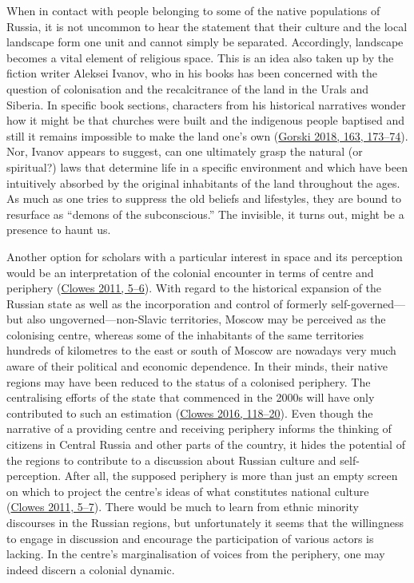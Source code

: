 \documentclass[
  english,
  a4paper,
  DIV=12,
  footlines=2.1,
  usegeometry=true]{scrartcl}
\begin{document}
\leavevmode\marginpar{\textcolor{parnum}{{[}8{]}}}When in contact with
people belonging to some of the native populations of Russia, it is not
uncommon to hear the statement that their culture and the local
landscape form one unit and cannot simply be separated. Accordingly,
landscape becomes a vital element of religious space. This is an idea
also taken up by the fiction writer Aleksei Ivanov, who in his books has
been concerned with the question of colonisation and the recalcitrance
of the land in the Urals and Siberia. In specific book sections,
characters from his historical narratives wonder how it might be that
churches were built and the indigenous people baptised and still it
remains impossible to make the land one's own
(\protect\hyperlink{ref-gorski_enchanted_2018}{Gorski 2018, 163,
173--74}). Nor, Ivanov appears to suggest, can one ultimately grasp the
natural (or spiritual?) laws that determine life in a specific
environment and which have been intuitively absorbed by the original
inhabitants of the land throughout the ages. As much as one tries to
suppress the old beliefs and lifestyles, they are bound to resurface as
``demons of the subconscious.'' The invisible, it turns out, might be a
presence to haunt us.

\leavevmode\marginpar{\textcolor{parnum}{{[}9{]}}}Another option for
scholars with a particular interest in space and its perception would be
an interpretation of the colonial encounter in terms of centre and
periphery (\protect\hyperlink{ref-clowes_russia_2011}{Clowes 2011,
5--6}). With regard to the historical expansion of the Russian state as
well as the incorporation and control of formerly self-governed---but
also ungoverned---non-Slavic territories, Moscow may be perceived as the
colonising centre, whereas some of the inhabitants of the same
territories hundreds of kilometres to the east or south of Moscow are
nowadays very much aware of their political and economic dependence. In
their minds, their native regions may have been reduced to the status of
a colonised periphery. The centralising efforts of the state that
commenced in the 2000s will have only contributed to such an estimation
(\protect\hyperlink{ref-clowes_centrifugal_2016}{Clowes 2016, 118--20}).
Even though the narrative of a providing centre and receiving periphery
informs the thinking of citizens in Central Russia and other parts of
the country, it hides the potential of the regions to contribute to a
discussion about Russian culture and self-perception. After all, the
supposed periphery is more than just an empty screen on which to project
the centre's ideas of what constitutes national culture
(\protect\hyperlink{ref-clowes_russia_2011}{Clowes 2011, 5--7}). There
would be much to learn from ethnic minority discourses in the Russian
regions, but unfortunately it seems that the willingness to engage in
discussion and encourage the participation of various actors is lacking.
In the centre's marginalisation of voices from the periphery, one may
indeed discern a colonial dynamic.
\end{document}
